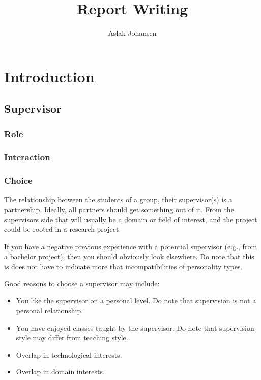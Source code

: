 \documentclass[a4paper]{memoir}
\title{Report Writing \\ \scalebox{0.85}{for Software BSc and MSc Projects}}
\author{Aslak Johansen}
\begin{document}
\maketitle
\tableofcontents

\chapter{Introduction}


\section{Supervisor}

\subsection{Role}

\subsection{Interaction}

\subsection{Choice}

The relationship between the students of a group, their supervisor(s) is a partnership. Ideally, all partners should get something out of it. From the supervisors side that will usually be a domain or field of interest, and the project could be rooted in a research project.

If you have a negative previous experience with a potential supervisor (e.g., from a bachelor project), then you should obviously look elsewhere. Do note that this is does not have to indicate more that incompatibilities of personality types.

Good reasons to choose a supervisor may include:
\begin{itemize}
  \item You like the supervisor on a personal level. Do note that supervision is not a personal relationship.
  \item You have enjoyed classes taught by the supervisor. Do note that supervision style may differ from teaching style.
  \item Overlap in technological interests.
  \item Overlap in domain interests.
\end{itemize}
\end{document}
